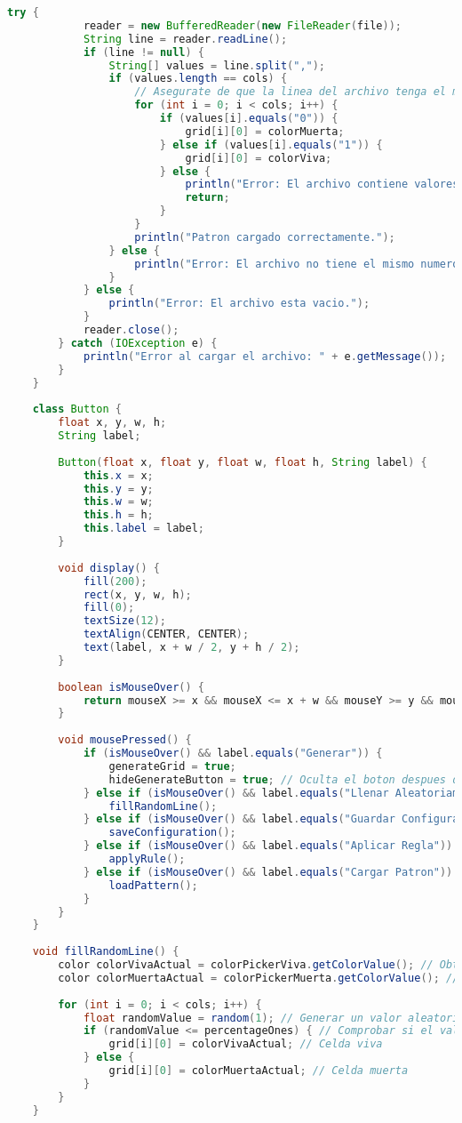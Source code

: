 \documentclass{article}
\begin{document}
\begin{lstlisting}[language=Java, basicstyle=\tiny, breaklines=true, breakatwhitespace=true]
		try {
			reader = new BufferedReader(new FileReader(file));
			String line = reader.readLine();
			if (line != null) {
				String[] values = line.split(",");
				if (values.length == cols) {
					// Asegurate de que la linea del archivo tenga el mismo numero de celdas que la cuadricula actual
					for (int i = 0; i < cols; i++) {
						if (values[i].equals("0")) {
							grid[i][0] = colorMuerta;
						} else if (values[i].equals("1")) {
							grid[i][0] = colorViva;
						} else {
							println("Error: El archivo contiene valores no validos.");
							return;
						}
					}
					println("Patron cargado correctamente.");
				} else {
					println("Error: El archivo no tiene el mismo numero de celdas que la cuadricula.");
				}
			} else {
				println("Error: El archivo esta vacio.");
			}
			reader.close();
		} catch (IOException e) {
			println("Error al cargar el archivo: " + e.getMessage());
		}
	}
	
	class Button {
		float x, y, w, h;
		String label;
		
		Button(float x, float y, float w, float h, String label) {
			this.x = x;
			this.y = y;
			this.w = w;
			this.h = h;
			this.label = label;
		}
		
		void display() {
			fill(200);
			rect(x, y, w, h);
			fill(0);
			textSize(12);
			textAlign(CENTER, CENTER);
			text(label, x + w / 2, y + h / 2);
		}
		
		boolean isMouseOver() {
			return mouseX >= x && mouseX <= x + w && mouseY >= y && mouseY <= y + h;
		}
		
		void mousePressed() {
			if (isMouseOver() && label.equals("Generar")) {
				generateGrid = true;
				hideGenerateButton = true; // Oculta el boton despues de hacer clic
			} else if (isMouseOver() && label.equals("Llenar Aleatoriamente")) {
				fillRandomLine();
			} else if (isMouseOver() && label.equals("Guardar Configuracion")) {
				saveConfiguration();
			} else if (isMouseOver() && label.equals("Aplicar Regla")) {
				applyRule();
			} else if (isMouseOver() && label.equals("Cargar Patron")) {
				loadPattern();
			}
		}
	}
	
	void fillRandomLine() {
		color colorVivaActual = colorPickerViva.getColorValue(); // Obtener el color actual de celda viva
		color colorMuertaActual = colorPickerMuerta.getColorValue(); // Obtener el color actual de celda muerta
		
		for (int i = 0; i < cols; i++) {
			float randomValue = random(1); // Generar un valor aleatorio entre 0 y 1
			if (randomValue <= percentageOnes) { // Comprobar si el valor esta dentro del porcentaje de unos deseado
				grid[i][0] = colorVivaActual; // Celda viva
			} else {
				grid[i][0] = colorMuertaActual; // Celda muerta
			}
		}
	}
	

\end{lstlisting}
\end{document}
